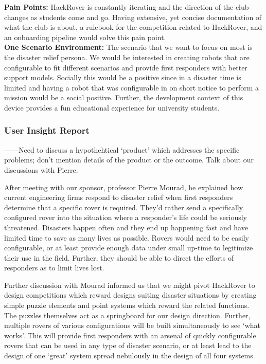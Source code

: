 \documentclass[a4paper, 10pt]{article}
\begin{document}
		\textbf{Pain Points:}
		HackRover is constantly iterating and the direction of the club changes as students come and go. Having extensive, yet concise documentation of what the club is about, a rulebook for the competition related to HackRover, and an onboarding pipeline would solve this pain point. \\

		\textbf{One Scenario Environment:}
		The scenario that we want to focus on most is the disaster relief persona. We would be interested in creating robots that are configurable to fit different scenarios and provide first responders with better support models. Socially this would be a positive since in a disaster time is limited and having a robot that was configurable in on short notice to perform a mission would be a social positive. Further, the development context of this device provides a fun educational experience for university students. 

		\subsubsection{User Insight Report}
		------Need to discuss a hypothehtical `product' which addresses the specific problems; don't mention details of the product or the outcome. Talk about our discussions with Pierre. 	
		
		After meeting with our sponsor, professor Pierre Mourad, he explained how current engineering firms respond to disaster relief when first responders determine that a specific rover is required. They’d rather send a specifically configured rover into the situation where a responder’s life could be seriously threatened. Disasters happen often and they end up happening fast and have limited time to save as many lives as possible. Rovers would need to be easily configurable, or at least provide enough data under small up-time to legitimize their use in the field. Further, they should be able to direct the efforts of responders as to limit lives lost.

Further discussion with Mourad informed us that we might pivot HackRover to design competitions which reward designs suiting disaster situations by creating simple puzzle elements and point systems which reward the related functions. The puzzles themselves act as a springboard for our design direction. Further, multiple rovers of various configurations will be built simultaneously to see ‘what works’. This will provide first responders with an arsenal of quickly configurable rovers that can be used in any type of disaster scenario, or at least lead to the design of one ‘great’ system spread nebulously in the design of all four systems.
\end{document}
